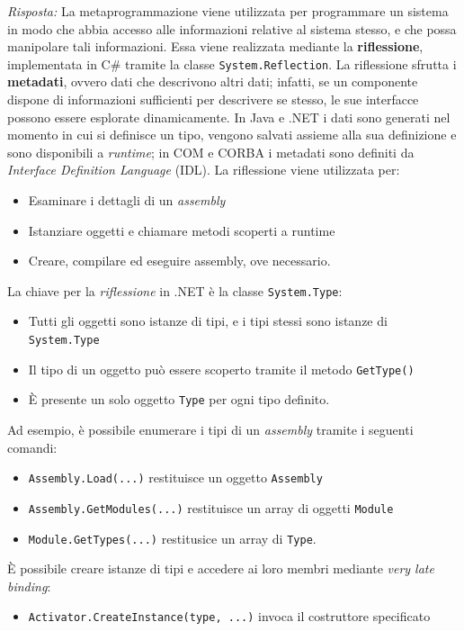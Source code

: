 \documentclass{article}
\newenvironment{solution}
    {\textit{Risposta:}}
    {}
\begin{document}
\begin{solution}
La metaprogrammazione viene utilizzata per programmare  un sistema in modo che abbia accesso alle informazioni relative al sistema stesso, e che possa manipolare tali informazioni.
Essa viene realizzata mediante la \textbf{riflessione}, implementata in C\# tramite la classe \texttt{System.Reflection}.
La riflessione sfrutta i \textbf{metadati}, ovvero dati che descrivono altri dati; infatti, se un componente dispone di informazioni sufficienti per descrivere se stesso, le sue interfacce possono essere esplorate dinamicamente.
In Java e .NET i dati sono generati nel momento in cui si definisce un tipo, vengono salvati assieme alla sua definizione e sono disponibili a \textit{runtime}; in COM e CORBA i metadati sono definiti da \textit{Interface Definition Language} (IDL).
La riflessione viene utilizzata per:
\begin{itemize}
	\item Esaminare i dettagli di un \textit{assembly}
	\item Istanziare oggetti e chiamare metodi scoperti a runtime
	\item Creare, compilare ed eseguire assembly, ove necessario.
\end{itemize}
La chiave per la \textit{riflessione} in .NET è la classe \texttt{System.Type}:
\begin{itemize}
	\item Tutti gli oggetti sono istanze di tipi, e i tipi stessi sono istanze di \texttt{System.Type}
	\item Il tipo di un oggetto può essere scoperto tramite il metodo \texttt{GetType()}
	\item È presente un solo oggetto \texttt{Type} per ogni tipo definito.
\end{itemize}
Ad esempio, è possibile enumerare i tipi di un \textit{assembly} tramite i seguenti comandi:
\begin{itemize}
	\item \texttt{Assembly.Load(...)} restituisce un oggetto \texttt{Assembly}
	\item \texttt{Assembly.GetModules(...)} restituisce un array di oggetti \texttt{Module}
	\item \texttt{Module.GetTypes(...)} restitusice un array di \texttt{Type}.
\end{itemize}
È possibile creare istanze di tipi e accedere ai loro membri mediante \textit{very late binding}:
\begin{itemize}
	\item \texttt{Activator.CreateInstance(type, ...)} invoca il costruttore specificato

\end{itemize}
\end{solution}
\end{document}
